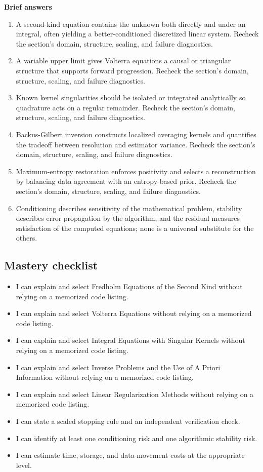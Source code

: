 \documentclass[10pt,letterpaper]{article}
\begin{document}
\textbf{Brief answers}
\begin{enumerate}
\item A second-kind equation contains the unknown both directly and under an integral, often yielding a better-conditioned discretized linear system. Recheck the section's domain, structure, scaling, and failure diagnostics.
\item A variable upper limit gives Volterra equations a causal or triangular structure that supports forward progression. Recheck the section's domain, structure, scaling, and failure diagnostics.
\item Known kernel singularities should be isolated or integrated analytically so quadrature acts on a regular remainder. Recheck the section's domain, structure, scaling, and failure diagnostics.
\item Backus-Gilbert inversion constructs localized averaging kernels and quantifies the tradeoff between resolution and estimator variance. Recheck the section's domain, structure, scaling, and failure diagnostics.
\item Maximum-entropy restoration enforces positivity and selects a reconstruction by balancing data agreement with an entropy-based prior. Recheck the section's domain, structure, scaling, and failure diagnostics.
\item Conditioning describes sensitivity of the mathematical problem, stability describes error propagation by the algorithm, and the residual measures satisfaction of the computed equations; none is a universal substitute for the others.
\end{enumerate}

\subsection*{Mastery checklist}
\begin{itemize}
\item[$\square$] I can explain and select Fredholm Equations of the Second Kind without relying on a memorized code listing.
\item[$\square$] I can explain and select Volterra Equations without relying on a memorized code listing.
\item[$\square$] I can explain and select Integral Equations with Singular Kernels without relying on a memorized code listing.
\item[$\square$] I can explain and select Inverse Problems and the Use of A Priori Information without relying on a memorized code listing.
\item[$\square$] I can explain and select Linear Regularization Methods without relying on a memorized code listing.
\item[$\square$] I can state a scaled stopping rule and an independent verification check.
\item[$\square$] I can identify at least one conditioning risk and one algorithmic stability risk.
\item[$\square$] I can estimate time, storage, and data-movement costs at the appropriate level.
\end{itemize}
\end{document}
